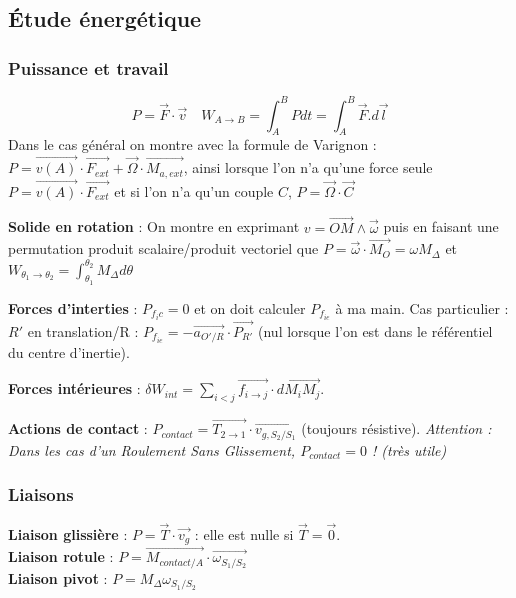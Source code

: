 \documentclass[9pt]{article}
\begin{document}
\begin{multicols*}{2}
\setlength{\columnseprule}{0.1pt}
\part{Étude énergétique}
\section{Puissance et travail}
$$\boxed{P = \overrightarrow{F}\cdot\overrightarrow{v}} \quad \boxed{W_{A \rightarrow B} = \int_A^BPdt = \int_A^B\overrightarrow{F}.d\overrightarrow{l}}$$
Dans le cas général on montre avec la formule de Varignon :
$\boxed{P = \overrightarrow{v(A)}\cdot\overrightarrow{F_{ext}} + \overrightarrow{\Omega}\cdot \overrightarrow{M_{a,ext}}}$, ainsi lorsque l'on n'a qu'une force seule $P = \overrightarrow{v(A)}\cdot\overrightarrow{F_{ext}}$  et si l'on n'a qu'un couple $C$, $P = \overrightarrow{\Omega}\cdot\overrightarrow{C}$

\textbf{Solide en rotation} : On montre en exprimant $v=\overrightarrow{OM}\wedge\overrightarrow{\omega}$ puis en faisant une permutation produit scalaire/produit vectoriel que $\boxed{P = \overrightarrow{\omega}\cdot\overrightarrow{M_O} = \omega M_\Delta}$ et $\boxed{W_{\theta_1 \rightarrow \theta_2} = \int_{\theta_1}^{\theta_2}M_\Delta d\theta}$

\textbf{Forces d'interties} : $P_{f_ic} = 0$ et on doit calculer $P_{f_{ie}}$ à ma main. Cas particulier : $R'$ en translation/R : $P_{f_{ie}} = -\overrightarrow{a_{O'/R}} \cdot \overrightarrow{P_{R'}}$ (nul lorsque l'on est dans le référentiel du centre d'inertie).

\textbf{Forces intérieures} : $\delta W_{int} = \sum_{i<j} \overrightarrow{f_{i \rightarrow j}} \cdot \overrightarrow{dM_iM_j}$.

\textbf{Actions de contact} : $P_{contact} = \overrightarrow{T_{2 \rightarrow 1}} \cdot \overrightarrow{v_{g,S_2/S_1}}$ (toujours résistive). \textit{Attention : Dans les cas d'un Roulement Sans Glissement, $P_{contact} = 0$ ! (très utile)}

\section{Liaisons}
\textbf{Liaison glissière} : $P=\overrightarrow{T}\cdot\overrightarrow{v_g}$ : elle est nulle si $\overrightarrow{T} = \overrightarrow{0}$.\\
\textbf{Liaison rotule} : $P = \overrightarrow{M_{contact/A}} \cdot \overrightarrow{\omega_{S_1/S_2}}$\\
\textbf{Liaison pivot} : $P = M_\Delta \omega_{S_1/S_2}$


\end{multicols*}
\end{document}
